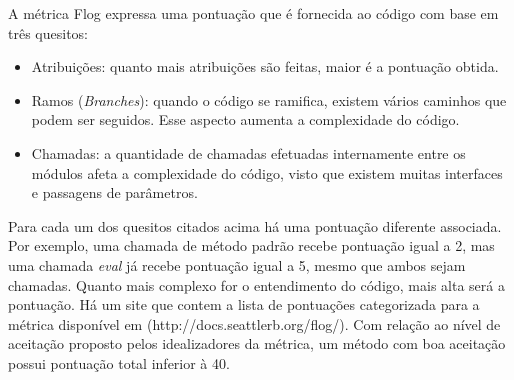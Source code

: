 A métrica Flog expressa uma pontuação que é fornecida ao código com base em três quesitos:

\begin{itemize}
	\item Atribuições: quanto mais atribuições são feitas, maior é a pontuação obtida.
	\item Ramos (\textit{Branches}): quando o código se ramifica, existem vários caminhos que podem ser seguidos. Esse aspecto aumenta a complexidade do código.
	\item Chamadas: a quantidade de chamadas efetuadas internamente entre os módulos afeta a complexidade do código, visto que existem muitas interfaces e passagens de parâmetros.
\end{itemize}

Para cada um dos quesitos citados acima há uma pontuação diferente associada. Por exemplo, uma chamada de método padrão recebe pontuação igual a 2, mas uma chamada \textit{eval} já recebe pontuação igual a 5, mesmo que ambos sejam chamadas. Quanto mais complexo for o entendimento do código, mais alta será a pontuação. Há um site que contem a lista de pontuações categorizada para a métrica disponível em (http://docs.seattlerb.org/flog/). Com relação ao nível de aceitação proposto pelos idealizadores da métrica, um método com boa aceitação possui pontuação total inferior à 40.